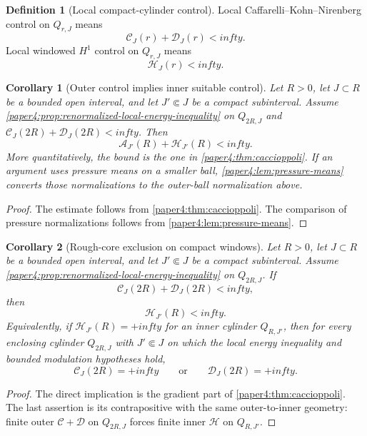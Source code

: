 \documentclass[11pt]{amsart}
\def\mathbb#1{#1}%
\def\infty{infty}%
\theoremstyle{plain}
\newtheorem{corollary}[corollary]{Corollary}
\theoremstyle{definition}
\newtheorem{definition}[definition]{Definition}
\theoremstyle{remark}
\begin{document}
\begin{definition}[Local compact-cylinder control]
Local Caffarelli--Kohn--Nirenberg control on $Q_{r,J}$ means
\[
\mathcal C_J(r)+\mathcal D_J(r)<\infty.
\]
Local windowed $H^1$ control on $Q_{r,J}$ means
\[
\mathcal H_J(r)<\infty.
\]
\end{definition}

\begin{corollary}[Outer control implies inner suitable control]\label{paper4:cor:outer-inner}
Let $R>0$, let $J\subset\mathbb R$ be a bounded open interval, and let
$J'\Subset J$ be a compact subinterval. Assume \cref{paper4:prop:renormalized-local-energy-inequality} on $Q_{2R,J}$ and
$\mathcal C_J(2R)+\mathcal D_J(2R)<\infty$. Then
\[
\mathcal A_{J'}(R)+\mathcal H_{J'}(R)<\infty.
\]
More quantitatively, the bound is the one in \cref{paper4:thm:caccioppoli}. If an
argument uses pressure means on a smaller ball, \cref{paper4:lem:pressure-means}
converts those normalizations to the outer-ball normalization above.
\end{corollary}

\begin{proof}
The estimate follows from \cref{paper4:thm:caccioppoli}. The comparison of pressure normalizations follows from
\cref{paper4:lem:pressure-means}.
\end{proof}

\begin{corollary}[Rough-core exclusion on compact windows]\label{paper4:cor:rough-core}
Let $R>0$, let $J\subset\mathbb R$ be a bounded open interval, and let
$J'\Subset J$ be a compact subinterval. Assume \cref{paper4:prop:renormalized-local-energy-inequality} on $Q_{2R,J}$. If
\[
\mathcal C_J(2R)+\mathcal D_J(2R)<\infty,
\]
then
\[
\mathcal H_{J'}(R)<\infty.
\]
Equivalently, if $\mathcal H_{J'}(R)=+\infty$ for an inner cylinder
$Q_{R,J'}$, then for every enclosing cylinder $Q_{2R,J}$ with
$J'\Subset J$ on which the local energy inequality and bounded
modulation hypotheses hold,
\[
\mathcal C_J(2R)=+\infty
\qquad\text{or}\qquad
\mathcal D_J(2R)=+\infty.
\]
\end{corollary}

\begin{proof}
The direct implication is the gradient part of \cref{paper4:thm:caccioppoli}. The
last assertion is its contrapositive with the same outer-to-inner geometry:
finite outer $\mathcal C+\mathcal D$ on $Q_{2R,J}$ forces finite inner
$\mathcal H$ on $Q_{R,J'}$.
\end{proof}
\end{document}
